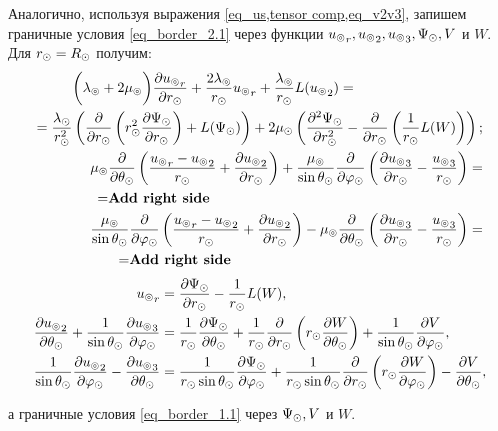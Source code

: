 Аналогично, используя выражения \cref{eq_us,tensor comp,eq_v2v3}, запишем граничные условия \cref{eq_border_2.1} через функции ${u_\circledcirc}_r, {u_\circledcirc}_2, {u_\circledcirc}_3, \Psi_\odot, V$ и $W.$ Для $r_\odot = R_\odot$ получим:
\begin{align}
\begin{split}
&\biggl(\la\l+2\mu\l\biggr)\fr{\de {u\l}_r}{\de r\s} + \fr{2\la\l}{r\s}{u\l}_r + \fr{\la\l}{r\s}L({u\l}_2) = \\
= \fr{\la\s}{r\s^2}&\left(\fr{\de}{\de r\s}\left(r\s^2\fr{\de\P\s}{\de r\s}\right)+L(\P\s)\right) + 2\mu\s\left(\fr{\de^2 \P\s}{\de r\s^2} - \fr{\de}{\de r\s}\left(\fr{1}{r\s}L(W)\right)\right);
\end{split}\\
\begin{split}
\mu\l&\fr{\de}{\de \Q\s}\left(\fr{{u\l}_r-{u\l}_2}{r\s} + \fr{\de {u\l}_2}{\de r\s}\right) + \fr{\mu\l}{\sin\Q\s}\fr{\de}{\de \f\s}\left(\fr{\de {u\l}_3}{\de r\s} - \fr{{u\l}_3}{r\s}\right) = \\
= &\text{\todo{Add right side}}
\end{split}\\
\begin{split}
\fr{\mu\l}{\sin\Q\s}&\fr{\de}{\de \f\s}\left(\fr{{u\l}_r-{u\l}_2}{r\s} + \fr{\de {u\l}_2}{\de r\s}\right) - \mu\l\fr{\de}{\de \Q\s}\left(\fr{\de {u\l}_3}{\de r\s} - \fr{{u\l}_3}{r\s}\right) = \\
= &\text{\todo{Add right side}}
\end{split}
\end{align}
\begin{align}
{u_\circledcirc}_r &= \frac{\partial \Psi_\odot}{\partial r_\odot} - \frac{1}{r_\odot}L(W),\\
\dfrac{\partial {u_\circledcirc}_2}{\partial\theta_\odot} + \frac1{\sin\theta_\odot}\frac{\partial {u_\circledcirc}_3}{\partial\varphi_\odot} &= \frac{1}{r_\odot}\frac{\partial \Psi_\odot}{\partial \theta_\odot} + \frac{1}{r_\odot}\frac{\partial}{\partial r_\odot}\left(r_\odot\frac{\partial W}{\partial \theta_\odot}\right) + \frac{1}{\sin\theta_\odot}\frac{\partial V}{\partial\varphi_\odot},\\
\dfrac1{\sin\theta_\odot}\dfrac{\partial {u_\circledcirc}_2}{\partial\varphi_\odot} - \dfrac{\partial {u_\circledcirc}_3}{\partial\theta_\odot} &= \frac{1}{r_\odot \sin\theta_\odot}\frac{\partial \Psi_\odot}{\partial \varphi_\odot} + \frac{1}{r_\odot\sin\theta_\odot}\frac{\partial}{\partial r_\odot}\left(r_\odot\frac{\partial W}{\partial \varphi_\odot}\right) - \frac{\partial V}{\partial \theta_\odot},
\end{align}

 а граничные условия \cref{eq_border_1.1} через $\Psi_\odot, V$ и $W.$

